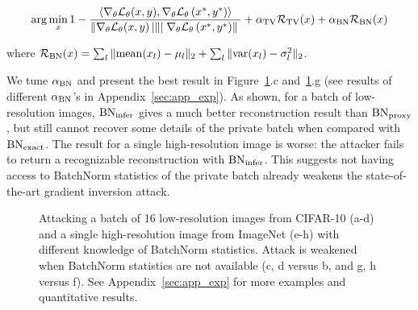 \begingroup
\begin{equation}
\label{eq:objective}
    \arg \min _{x}  1-\frac{\left\langle\nabla_{\theta} \mathcal{L}_{\theta}(x, y), \nabla_{\theta} \mathcal{L}_{\theta}\left(x^{*}, y^{*}\right)\right\rangle}{\left\|\nabla _ { \theta } \mathcal { L } _ { \theta } ( x , y ) \left|\left\|\mid \nabla_{\theta} \mathcal{L}_{\theta}\left(x^{*}, y^{*}\right)\right\|\right.\right.}+ \alpha_{\rm TV} \mathcal{R}_{\rm TV}(x) + \alpha_{\rm BN} \mathcal{R}_{\rm BN}(x)
\end{equation}
\endgroup

where $ \mathcal{R}_{\mathrm{BN}}(x)=  \sum_{l} \| {\rm mean}(x_l)- \mu_l \|_{2} + \sum_{l} \| {\rm var}(x_l)- \sigma_l^2 \|_{2}$.


We tune $\alpha_{\rm BN}$ and present the best result in Figure~\ref{fig:BN_var}.c and~\ref{fig:BN_var}.g (see results of different $\alpha_{\rm BN}$'s in Appendix~\ref{sec:app_exp}). As shown, for a batch of low-resolution images, $\rm BN_{infer}$ gives a much better reconstruction result than $\rm BN_{proxy}$, but still cannot recover some details of the private batch when compared with $\rm BN_{exact}$. The result for a single high-resolution image is worse: the attacker fails to return a recognizable reconstruction with $\rm BN_{infer}$. This suggests not having access to BatchNorm statistics of the private batch already weakens the state-of-the-art gradient inversion attack.


\begin{figure}[H]
    \centering
    \subfloat[$\rm BN_{infer}$]{\texttt{[image: imgs/assumptions/BN/reconstructed\_train\_train\_bn=1e-3.png]}}
    \hspace{1mm}
    \caption{ Attacking a batch of 16 low-resolution images from CIFAR-10 (a-d) and a single high-resolution image from ImageNet (e-h) with different knowledge of BatchNorm statistics. 
    Attack is weakened when BatchNorm statistics are not available (c, d versus b, and g, h versus f). See Appendix~\ref{sec:app_exp} for more examples and quantitative results.}
    \label{fig:BN_var}
\end{figure}

